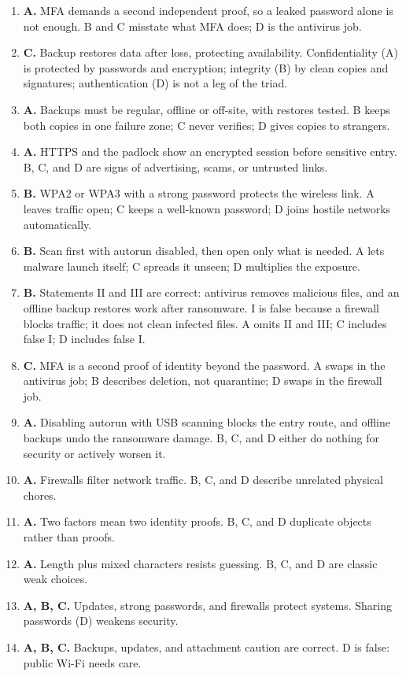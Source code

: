 \documentclass[11pt]{article}
\begin{document}
\begin{enumerate}[label=\textbf{Q\arabic*.}, leftmargin=*]
  and symbols. A, B, and C are short, predictable, or commonly attacked.
\item \textbf{A.} MFA demands a second independent proof, so a leaked
  password alone is not enough. B and C misstate what MFA does; D is the
  antivirus job.
\item \textbf{C.} Backup restores data after loss, protecting availability.
  Confidentiality (A) is protected by passwords and encryption; integrity (B)
  by clean copies and signatures; authentication (D) is not a leg of the
  triad.
\item \textbf{A.} Backups must be regular, offline or off-site, with restores
  tested. B keeps both copies in one failure zone; C never verifies; D gives
  copies to strangers.
\item \textbf{A.} HTTPS and the padlock show an encrypted session before
  sensitive entry. B, C, and D are signs of advertising, scams, or untrusted
  links.
\item \textbf{B.} WPA2 or WPA3 with a strong password protects the wireless
  link. A leaves traffic open; C keeps a well-known password; D joins hostile
  networks automatically.
\item \textbf{B.} Scan first with autorun disabled, then open only what is
  needed. A lets malware launch itself; C spreads it unseen; D multiplies the
  exposure.
\item \textbf{B.} Statements II and III are correct: antivirus removes
  malicious files, and an offline backup restores work after ransomware. I is
  false because a firewall blocks traffic; it does not clean infected files.
  A omits II and III; C includes false I; D includes false I.
\item \textbf{C.} MFA is a second proof of identity beyond the password. A
  swaps in the antivirus job; B describes deletion, not quarantine; D swaps in
  the firewall job.
\item \textbf{A.} Disabling autorun with USB scanning blocks the entry route,
  and offline backups undo the ransomware damage. B, C, and D either do
  nothing for security or actively worsen it.

\item \textbf{A.} Firewalls filter network traffic. B, C, and D describe unrelated physical chores.
\item \textbf{A.} Two factors mean two identity proofs. B, C, and D duplicate objects rather than proofs.
\item \textbf{A.} Length plus mixed characters resists guessing. B, C, and D are classic weak choices.
\item \textbf{A, B, C.} Updates, strong passwords, and firewalls protect systems. Sharing passwords (D) weakens security.
\item \textbf{A, B, C.} Backups, updates, and attachment caution are correct. D is false: public Wi-Fi needs care.
\end{enumerate}
\def\JKSSBLessonID{44}\def\JKSSBAnswers{1}
\end{document}
